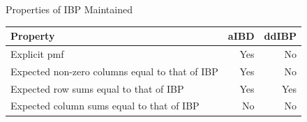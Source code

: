 \documentclass[serif,mathserif,final]{beamer}
\begin{document}
\begin{frame}{}
\begin{columns}[t]
\begin{column}{0.25\linewidth}
      \begin{block}{Properties of IBP Maintained}
        \vspace{.5em}
        \begin{center}
          \begin{tabular}{lrr}
            \toprule
            \textbf{Property} & \textbf{aIBD} & \textbf{ddIBP} \\ \midrule
            Explicit pmf & {\color{red}Yes} & {\color{red}No} \\
            Expected non-zero columns equal to that of IBP & {\color{red}Yes} & {\color{red}No} \\
              Expected row sums equal to that of IBP & Yes & Yes \\
              Expected column sums equal to that of IBP & No & No \\
            \bottomrule
          \end{tabular}
        \end{center}
      \end{block}


\end{column}
\end{columns}
\end{frame}
\end{document}
